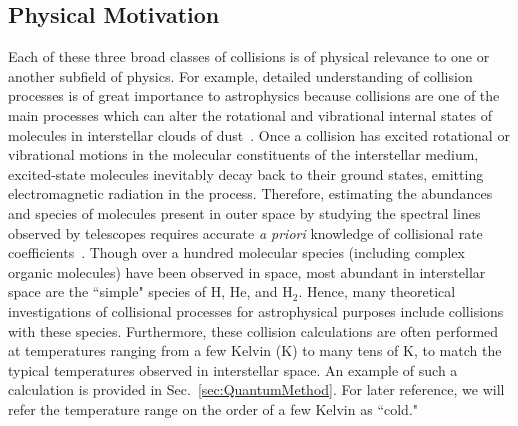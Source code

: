 \documentclass[%
 reprint,
 amsmath,amssymb,
 aps,
 nofootinbib
]{revtex4-1}
\begin{document}
\subsection{Physical Motivation}
Each of these three broad classes of collisions is of physical relevance to one or another subfield of physics. For example, detailed understanding of collision processes is of great importance to astrophysics because collisions are one of the main processes which can alter the rotational and vibrational internal states of molecules in interstellar clouds of dust~\cite{ColdChemBook,ColdMolsBook}. Once a collision has excited rotational or vibrational motions in the molecular constituents of the interstellar medium, excited-state molecules inevitably decay back to their ground states, emitting electromagnetic radiation in the process. Therefore, estimating the abundances and species of molecules present in outer space by studying the spectral lines observed by telescopes requires accurate \textit{a priori} knowledge of collisional rate coefficients~\cite{ColdChemBook}. Though over a hundred molecular species (including complex organic molecules) have been observed in space, most abundant in interstellar space are the ``simple" species of H, He, and H$_2$. Hence, many theoretical investigations of collisional processes for astrophysical purposes include collisions with these species. Furthermore, these collision calculations are often performed at temperatures ranging from a few Kelvin (K) to many tens of K, to match the typical temperatures observed in interstellar space. An example of such a calculation is provided in Sec.~\ref{sec:QuantumMethod}. For later reference, we will refer the temperature range on the order of a few Kelvin as ``cold."
\end{document}
